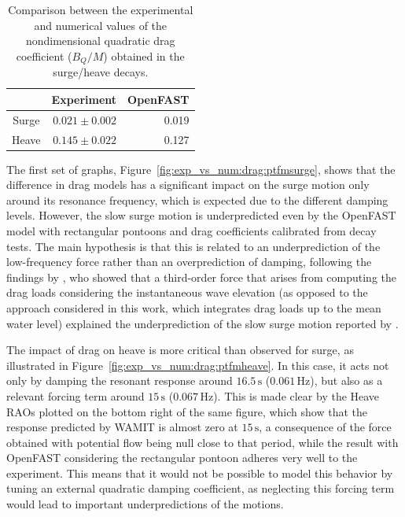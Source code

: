 \begin{table}[!hbtp]
	\caption{Comparison between the experimental and numerical values of the nondimensional quadratic drag coefficient ($B_Q/M$) obtained in the surge/heave decays.}\label{tab:exp_vs_num:drag:quad_damp_decay}
	\begin{tabular}{crr}
		\toprule
		& Experiment & OpenFAST \\
		\midrule
		Surge & $0.021\pm0.002$ & 0.019 \\
		Heave & $0.145\pm0.022$ & 0.127 \\
		\bottomrule%
	\end{tabular}%
\end{table}%

The first set of graphs, Figure~\ref{fig:exp_vs_num:drag:ptfmsurge}, shows that the difference in drag models has a significant impact on the surge motion only around its resonance frequency, which is expected due to the different damping levels. However, the slow surge motion is underpredicted even by the OpenFAST model with rectangular pontoons and drag coefficients calibrated from decay tests. The main hypothesis is that this is related to an underprediction of the low-frequency force rather than an overprediction of damping, following the findings by \citet{wang2022oc6}, who showed that a third-order force that arises from computing the drag loads considering the instantaneous wave elevation (as opposed to the approach considered in this work, which integrates drag loads up to the mean water level) explained the underprediction of the slow surge motion reported by \cite{OC52017}. 

The impact of drag on heave is more critical than observed for surge, as illustrated in Figure~\ref{fig:exp_vs_num:drag:ptfmheave}. In this case, it acts not only by damping the resonant response around $16.5\,\text{s}$ ($0.061\,\text{Hz}$), but also as a relevant forcing term around $15\,\text{s}$ ($0.067\,\text{Hz}$). This is made clear by the Heave RAOs plotted on the bottom right of the same figure, which show that the response predicted by WAMIT is almost zero at $15\,\text{s}$, a consequence of the force obtained with potential flow being null close to that period, while the result with OpenFAST considering the rectangular pontoon adheres very well to the experiment. This means that it would not be possible to model this behavior by tuning an external quadratic damping coefficient, as neglecting this forcing term would lead to important underpredictions of the motions. 


